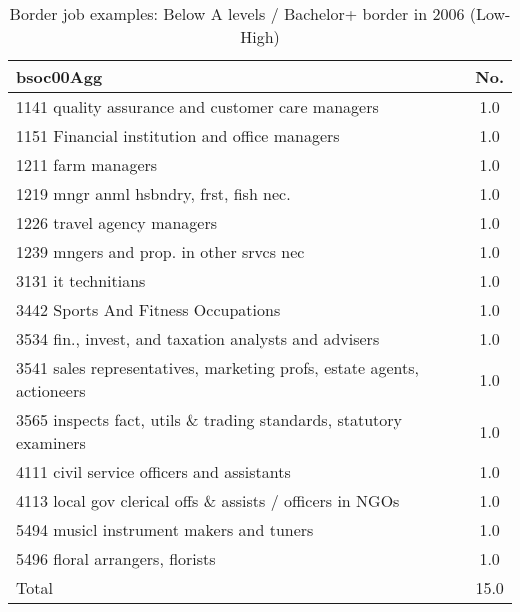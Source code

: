 \begin{table}[h!]
	\centering
	\caption{Border job examples: Below A levels / Bachelor+ border in 2006 (Low-High)}
	\label{tab:360113}
	\begin{tabular}{lc}
	\toprule
bsoc00Agg&No. \\
\hline
1141 quality assurance and customer care managers&1.0 \\
1151 Financial institution and office managers&1.0 \\
1211 farm managers&1.0 \\
1219 mngr anml hsbndry, frst, fish nec.&1.0 \\
1226 travel agency managers&1.0 \\
1239 mngers and prop. in other srvcs nec&1.0 \\
3131 it technitians&1.0 \\
3442 Sports And Fitness Occupations&1.0 \\
3534 fin., invest, and taxation analysts and advisers&1.0 \\
3541 sales representatives, marketing profs, estate agents, actioneers&1.0 \\
3565 inspects fact, utils \& trading standards, statutory examiners&1.0 \\
4111 civil service officers and assistants&1.0 \\
4113 local gov clerical offs \& assists / officers in NGOs&1.0 \\
5494 musicl instrument makers and tuners&1.0 \\
5496 floral arrangers, florists&1.0 \\
Total&15.0 \\
\bottomrule
\bottomrule
\end{tabular}
\end{table}
